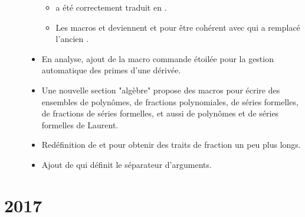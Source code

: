 \documentclass[12pt,a4paper]{book}
\begin{document}
\begin{description}
\begin{itemize}[itemsep=.5em]
\begin{itemize}[itemsep=.5em]
        \item {} a été correctement traduit en .

        \item Les macros  et  deviennent  et  pour être cohérent avec  qui a remplacé l'ancien .
    \end{itemize}




    \item En analyse, ajout de la macro commande étoilée  pour la gestion automatique des primes d'une dérivée.




    \item Une nouvelle section "algèbre" propose des macros pour écrire des ensembles de polynômes, de fractions polynomiales, de séries formelles, de fractions de séries formelles, et aussi de polynômes et de séries formelles de Laurent.




    \item Redéfinition de  et  pour obtenir des traits de fraction un peu plus longs.




    \item Ajout de  qui définit le séparateur d'arguments.
\end{itemize}

\end{description}



\section{2017}
\end{document}
